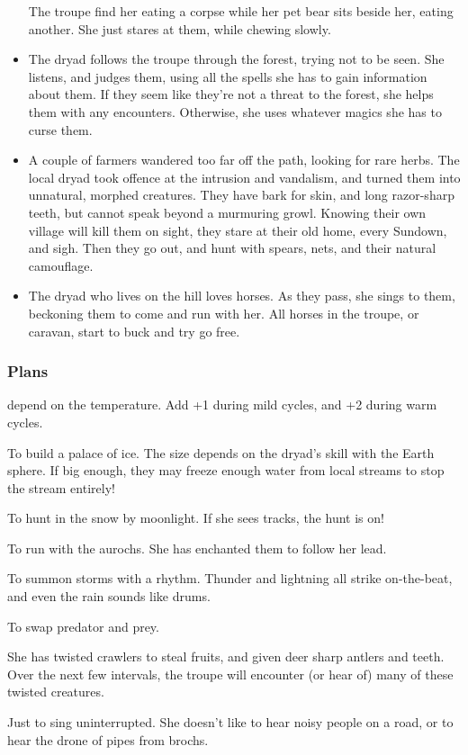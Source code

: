 \begin{multicols}{2}
\begin{itemize}
  The troupe find her eating a corpse while her pet bear sits beside her, eating another.
  She just stares at them, while chewing slowly.
  \item
  The \gls{dryad} follows the troupe through the forest, trying not to be seen.
  She listens, and judges them, using all the spells she has to gain information about them.
  If they seem like they're not a threat to the forest, she helps them with any encounters.
  Otherwise, she uses whatever magics she has to curse them.
  \item
  A couple of farmers wandered too far off the path, looking for rare herbs.
  The local \gls{dryad} took offence at the intrusion and vandalism, and turned them into unnatural, morphed creatures.
  They have bark for skin, and long razor-sharp teeth, but cannot speak beyond a murmuring growl.
  Knowing their own \gls{village} will kill them on sight, they stare at their old home, every Sundown, and sigh.
  Then they go out, and hunt with spears, nets, and their natural camouflage.
  \item
  The \gls{dryad} who lives on the hill loves horses.
  As they pass, she sings to them, beckoning them to come and run with her.
  All horses in the troupe, or caravan, start to buck and try go free.
\end{itemize}

\morphhuman

\subsubsection{Plans}
depend on the temperature.
Add +1 during mild \glspl{cycle}, and +2 during warm \glspl{cycle}.

\begin{dlist}
  \item
  To build a palace of ice.
  The size depends on the \gls{dryad}'s skill with the Earth \gls{sphere}.
  If big enough, they may freeze enough water from local streams to stop the stream entirely!
  \item
  To hunt in the snow by moonlight.
  If she sees tracks, the hunt is on!
  \item
  To run with the aurochs.
  She has enchanted them to follow her lead.
  \item
  To summon storms with a rhythm.
  Thunder and lightning all strike on-the-beat, and even the rain sounds like drums.
  \item
  To swap predator and prey.

  She has twisted \glspl{crawler} to steal fruits, and given deer sharp antlers and teeth.
  Over the next few \glspl{interval}, the troupe will encounter (or hear of) many of these twisted creatures.
  \item
  Just to sing uninterrupted.
  She doesn't like to hear noisy people on a road, or to hear the drone of pipes from \glspl{broch}.


\end{dlist}
\end{multicols}
